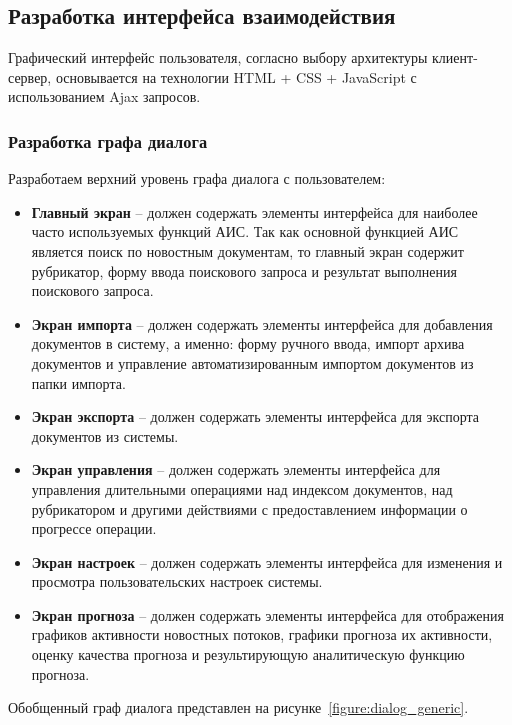 \subsection{Разработка интерфейса взаимодействия}

Графический интерфейс пользователя, согласно выбору архитектуры клиент-сервер, основывается на технологии HTML + CSS + JavaScript с использованием Ajax запросов. 

\subsubsection{Разработка графа диалога}

Разработаем верхний уровень графа диалога с пользователем:
\begin{itemize}
\item \textbf{Главный экран} -- должен содержать элементы интерфейса для наиболее часто используемых функций АИС. Так как основной функцией АИС является поиск по новостным документам, то главный экран содержит рубрикатор, форму ввода поискового запроса и результат выполнения поискового запроса.
\item \textbf{Экран импорта} -- должен содержать элементы интерфейса для добавления документов в систему, а именно: форму ручного ввода, импорт архива документов и управление автоматизированным импортом документов из папки импорта.
\item \textbf{Экран экспорта} -- должен содержать элементы интерфейса для экспорта документов из системы.
\item \textbf{Экран управления} -- должен содержать элементы интерфейса для управления длительными операциями над индексом документов, над рубрикатором и другими действиями с предоставлением информации о прогрессе операции.
\item \textbf{Экран настроек} -- должен содержать элементы интерфейса для изменения и просмотра пользовательских настроек системы.
\item \textbf{Экран прогноза} -- должен содержать элементы интерфейса для отображения графиков активности новостных потоков, графики прогноза их активности, оценку качества прогноза и результирующую аналитическую функцию прогноза.
\end{itemize}

Обобщенный граф диалога представлен на рисунке~\ref{figure:dialog_generic}.

